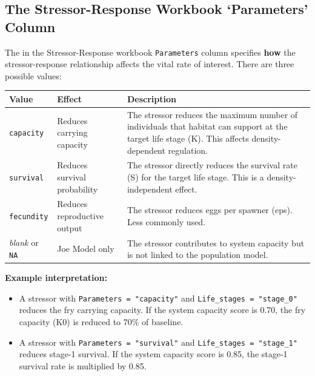 \documentclass[
  letterpaper,
  DIV=11,
  numbers=noendperiod]{scrreprt}
\providecommand{\tightlist}{%
  \setlength{\itemsep}{0pt}\setlength{\parskip}{0pt}}
\begin{document}
\subsection{The Stressor-Response Workbook `Parameters'
Column}\label{the-stressor-response-workbook-parameters-column}

The in the Stressor-Response workbook \texttt{Parameters} column
specifies \textbf{how} the stressor-response relationship affects the
vital rate of interest. There are three possible values:

\begin{longtable}[]{@{}
  >{\raggedright\arraybackslash}p{}
  >{\raggedright\arraybackslash}p{}
  >{\raggedright\arraybackslash}p{}@{}}
\toprule\noalign{}
\begin{minipage}[b]{\linewidth}\raggedright
Value
\end{minipage} & \begin{minipage}[b]{\linewidth}\raggedright
Effect
\end{minipage} & \begin{minipage}[b]{\linewidth}\raggedright
Description
\end{minipage} \\
\midrule\noalign{}
\endhead
\bottomrule\noalign{}
\endlastfoot
\texttt{capacity} & Reduces carrying capacity & The stressor reduces the
maximum number of individuals that habitat can support at the target
life stage (K). This affects density-dependent regulation. \\
\texttt{survival} & Reduces survival probability & The stressor directly
reduces the survival rate (S) for the target life stage. This is a
density-independent effect. \\
\texttt{fecundity} & Reduces reproductive output & The stressor reduces
eggs per spawner (eps). Less commonly used. \\
\emph{blank} or \texttt{NA} & Joe Model only & The stressor contributes
to system capacity but is not linked to the population model. \\
\end{longtable}

\textbf{Example interpretation:}

\begin{itemize}
\tightlist
\item
  A stressor with \texttt{Parameters\ =\ "capacity"} and
  \texttt{Life\_stages\ =\ "stage\_0"} reduces the fry carrying
  capacity. If the system capacity score is 0.70, the fry capacity (K0)
  is reduced to 70\% of baseline.
\item
  A stressor with \texttt{Parameters\ =\ "survival"} and
  \texttt{Life\_stages\ =\ "stage\_1"} reduces stage-1 survival. If the
  system capacity score is 0.85, the stage-1 survival rate is multiplied
  by 0.85.
\end{itemize}
\end{document}
